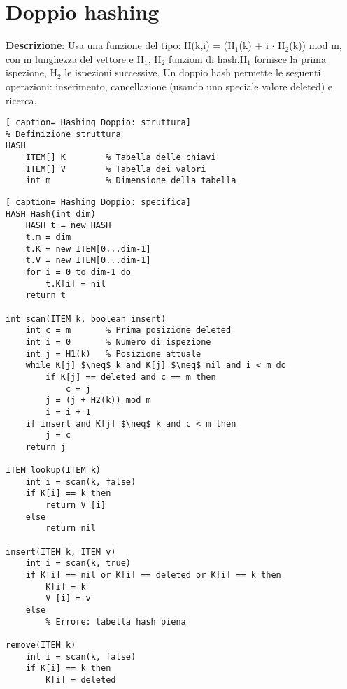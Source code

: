 \documentclass[../cheatSheetAlgoritmi.tex]{subfiles}
\begin{document}
\section{Doppio hashing}
\textbf{Descrizione}: Usa una funzione del tipo: H(k,i) = (H$_{1}$(k) + i $\cdot$ H$_{2}$(k)) mod m, con m lunghezza del vettore e H$_{1}$, H$_{2}$ funzioni di hash.H$_{1}$ fornisce la prima ispezione, H$_{2}$ le ispezioni successive. Un doppio hash permette le seguenti operazioni: inserimento, cancellazione (usando uno speciale valore deleted) e ricerca. 
\begin{lstlisting}[ caption= Hashing Doppio: struttura]
% Definizione struttura
HASH
	ITEM[] K		% Tabella delle chiavi
	ITEM[] V		% Tabella dei valori
	int m			% Dimensione della tabella
\end{lstlisting}
\newpage
\begin{lstlisting}[ caption= Hashing Doppio: specifica]
HASH Hash(int dim)
	HASH t = new HASH
	t.m = dim
	t.K = new ITEM[0...dim-1]
	t.V = new ITEM[0...dim-1]
	for i = 0 to dim-1 do
		t.K[i] = nil
	return t
	
int scan(ITEM k, boolean insert)
	int c = m		% Prima posizione deleted
	int i = 0		% Numero di ispezione
	int j = H1(k)	% Posizione attuale
	while K[j] $\neq$ k and K[j] $\neq$ nil and i < m do
		if K[j] == deleted and c == m then
			c = j
		j = (j + H2(k)) mod m
		i = i + 1
	if insert and K[j] $\neq$ k and c < m then
		j = c
	return j	
	
ITEM lookup(ITEM k)
	int i = scan(k, false)
	if K[i] == k then
		return V [i]
	else
		return nil
		
insert(ITEM k, ITEM v)
	int i = scan(k, true)
	if K[i] == nil or K[i] == deleted or K[i] == k then
		K[i] = k
		V [i] = v
	else
		% Errore: tabella hash piena
		
remove(ITEM k)
	int i = scan(k, false)
	if K[i] == k then
		K[i] = deleted
\end{lstlisting}

\newpage
\end{document}
